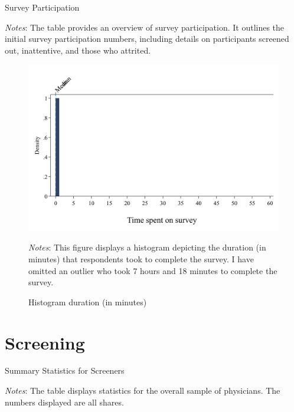 \documentclass[11pt]{article}
\theoremstyle{definition}
\begin{document}
\begin{table}[H]
    \centering
    \caption{Survey Participation}

     \parbox{.9\linewidth}{
        	\vspace{.2cm}
        		\scriptsize{\scriptsize{{\emph{Notes}: The table provides an overview of survey participation. It outlines the initial survey participation numbers, including details on participants screened out, inattentive, and those who attrited.}}}}
    \label{tab:completioncheck}
\end{table}

\begin{figure}[H]
	\centering
	\caption{Histogram duration (in minutes)}
	\label{fig:hist_duration}
	\begin{adjustbox}{max width=\textwidth}
		\includegraphics{Pre-Survey/figures/hist_duration.pdf}
	\end{adjustbox}
	\parbox{.9\linewidth}{
		\vspace{.2cm}
		\scriptsize{\emph{Notes}: This figure displays a histogram depicting the duration (in minutes) that respondents took to complete the survey. I have omitted an outlier who took 7 hours and 18 minutes to complete the survey.}
	}
\end{figure}

\clearpage

\section{Screening}\label{demo}

\begin{table}[H]
    \centering
    \caption{Summary Statistics for Screeners}
    	\begin{adjustbox}{max width=0.8\textwidth}

\end{adjustbox}
     \parbox{.9\linewidth}{
        	\vspace{.2cm}
        		\scriptsize{\scriptsize{{\emph{Notes}: The table displays statistics for the overall sample of physicians. The numbers displayed are all shares.}}}}
    \label{tab:screen_table}
\end{table}
\end{document}
